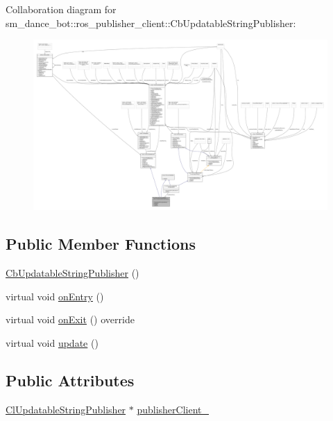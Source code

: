 Collaboration diagram for sm\+\_\+dance\+\_\+bot\+:\+:ros\+\_\+publisher\+\_\+client\+:\+:Cb\+Updatable\+String\+Publisher\+:
\nopagebreak
\begin{figure}[H]
\begin{center}
\leavevmode
\includegraphics[width=350pt]{classsm__dance__bot_1_1ros__publisher__client_1_1CbUpdatableStringPublisher__coll__graph}
\end{center}
\end{figure}
\subsection*{Public Member Functions}
\begin{DoxyCompactItemize}
\item 
\hyperlink{classsm__dance__bot_1_1ros__publisher__client_1_1CbUpdatableStringPublisher_a78e92d31b8defc074344464bdb462f11}{Cb\+Updatable\+String\+Publisher} ()
\item 
virtual void \hyperlink{classsm__dance__bot_1_1ros__publisher__client_1_1CbUpdatableStringPublisher_a0262b5090f2821839585c2a3dad332f5}{on\+Entry} ()
\item 
virtual void \hyperlink{classsm__dance__bot_1_1ros__publisher__client_1_1CbUpdatableStringPublisher_a29c8b5157dea5405c0c1462bab494626}{on\+Exit} () override
\item 
virtual void \hyperlink{classsm__dance__bot_1_1ros__publisher__client_1_1CbUpdatableStringPublisher_ac5c709bab393ae3aeb4e53c3ae14830a}{update} ()
\end{DoxyCompactItemize}
\subsection*{Public Attributes}
\begin{DoxyCompactItemize}
\item 
\hyperlink{classsm__dance__bot_1_1ClUpdatableStringPublisher}{Cl\+Updatable\+String\+Publisher} $\ast$ \hyperlink{classsm__dance__bot_1_1ros__publisher__client_1_1CbUpdatableStringPublisher_a9300324c9279e16474832966e5692201}{publisher\+Client\+\_\+}
\end{DoxyCompactItemize}


